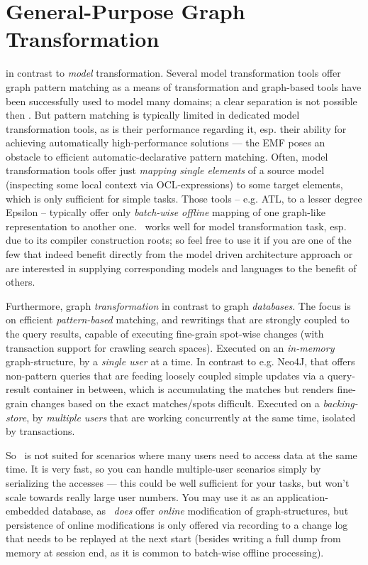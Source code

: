 \section{General-Purpose Graph Transformation}
in contrast to \emph{model} transformation.
Several model transformation tools offer graph pattern matching as a means of transformation and graph-based tools have been successfully used to model many domains; a clear separation is not possible then \cite{Jakumeit2013}.
But pattern matching is typically limited in dedicated model transformation tools, as is their performance regarding it, esp. their ability for achieving automatically high-performance solutions --- the EMF poses an obstacle to efficient automatic-declarative pattern matching.
Often, model transformation tools offer just \emph{mapping single elements} of a source model (inspecting some local context via OCL-expressions) to some target elements, which is only sufficient for simple tasks.
Those tools -- e.g. ATL\cite{atl}, to a lesser degree Epsilon\cite{epsilon} -- typically offer only \emph{batch-wise offline} mapping of one graph-like representation to another one.
\GrG\ works well for model transformation task, esp. due to its compiler construction roots; so feel free to use it if you are one of the few that indeed benefit directly from the model driven architecture approach or are interested in supplying corresponding models and languages to the benefit of others. 

Furthermore, graph \emph{transformation} in contrast to graph \emph{databases}.
The focus is on efficient \emph{pattern-based} matching, and rewritings that are strongly coupled to the query results, capable of executing fine-grain spot-wise changes (with transaction support for crawling search spaces). 
Executed on an \emph{in-memory} graph-structure, by a \emph{single user} at a time.
In contrast to e.g. Neo4J\cite{neo}, that offers non-pattern queries that are feeding loosely coupled simple updates via a query-result container in between, which is accumulating the matches but renders fine-grain changes based on the exact matches/spots difficult.
Executed on a \emph{backing-store}, by \emph{multiple users} that are working concurrently at the same time, isolated by transactions.

So \GrG\ is not suited for scenarios where many users need to access data at the same time. 
It is very fast, so you can handle multiple-user scenarios simply by serializing the accesses --- this could be well sufficient for your tasks, but won't scale towards really large user numbers.
You may use it as an application-embedded database, as
\GrG\ \emph{does} offer \emph{online} modification of graph-structures,
but persistence of online modifications is only offered via recording to a change log that needs to be replayed at the next start
(besides writing a full dump from memory at session end, as it is common to batch-wise offline processing).

